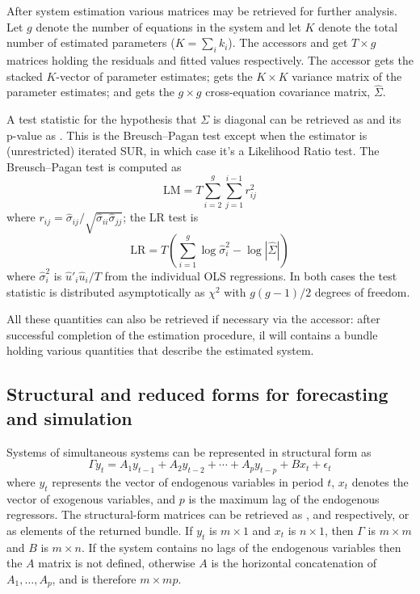 After system estimation various matrices may be retrieved for further
analysis.  Let $g$ denote the number of equations in the system and
let $K$ denote the total number of estimated parameters ($K = \sum_i
k_i$). The accessors  and  get $T \times g$
matrices holding the residuals and fitted values respectively. The
accessor  gets the stacked $K$-vector of parameter
estimates;  gets the $K \times K$ variance matrix of the
parameter estimates; and  gets the $g \times g$
cross-equation covariance matrix, $\hat{\Sigma}$.

A test statistic for the hypothesis that $\Sigma$ is diagonal can be
retrieved as  and its p-value as
. This is the Breusch--Pagan test except when the
estimator is (unrestricted) iterated SUR, in which case it's a
Likelihood Ratio test. The Breusch--Pagan test is computed as
\[
\mbox{LM} = T \sum_{i=2}^g \sum_{j=1}^{i-1} r^2_{ij}
\]
where $r_{ij} = \hat{\sigma}_{ij} /
\sqrt{\hat{\sigma}_{ii}\hat{\sigma}_{jj}}$; the LR test is
\[
\mbox{LR} = T \left(\sum_{i=1}^g \log \hat{\sigma}^2_i -\log 
 |\hat{\Sigma}| \right)
\]
where $\hat{\sigma}^2_i$ is $\hat{u}'_i \hat{u}_i / T$ from the
individual OLS regressions. In both cases the test statistic is
distributed asymptotically as $\chi^2$ with $g(g-1)/2$ degrees of
freedom. 

All these quantities can also be retrieved if necessary via the
 accessor: after successful completion of the estimation
procedure, il will contains a bundle holding various quantities that
describe the estimated system.

\subsection{Structural and reduced forms for forecasting and
  simulation}

Systems of simultaneous systems can be represented in structural form
as
\[
\Gamma y_t = A_1 y_{t-1} + A_2 y_{t-2} + \cdots + A_p y_{t-p}
 + B x_t + \epsilon_t
\]
where $y_t$ represents the vector of endogenous variables in period
$t$, $x_t$ denotes the vector of exogenous variables, and $p$ is the
maximum lag of the endogenous regressors.  The structural-form
matrices can be retrieved as ,  and
 respectively, or as elements of the returned
 bundle. If $y_t$ is $m \times 1$
and $x_t$ is $n \times 1$, then $\Gamma$ is $m \times m$ and $B$ is
$m \times n$. If the system contains no lags of the endogenous
variables then the $A$ matrix is not defined, otherwise $A$ is the
horizontal concatenation of $A_1,\dots,A_p$, and is therefore
$m \times mp$.

